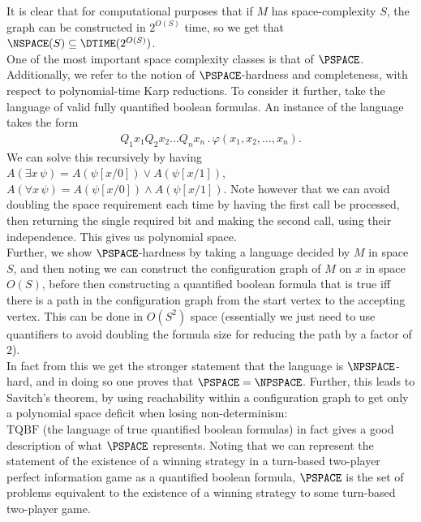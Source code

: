 \documentclass{tikzposter} %
\begin{document}
\begin{columns}
{  It is clear that for computational purposes that if $M$ has space-complexity $S$, the graph can be constructed in $2^{O(S)}$ time, so we get that $\NSPACE(S) \subseteq \DTIME(2^{O(S)})$. \\

  One of the most important space complexity classes is that of $\PSPACE$. Additionally, we refer to the notion of $\PSPACE$-hardness and completeness, with respect to polynomial-time Karp reductions. To consider it further, take the language of valid fully quantified boolean formulas. An instance of the language takes the form
  \begin{align*}
    Q_{1} x_{1} Q_{2} x_{2} \dots Q_{n} x_{n} \,.\, \varphi(x_{1},x_{2},\dots,x_{n}).
  \end{align*}
  We can solve this recursively by having $A(\exists x\, \psi) = A(\psi[x / 0]) \lor A(\psi[x/1])$, $A(\forall x\, \psi) = A(\psi[x/0]) \land A(\psi[x/1])$. Note however that we can avoid doubling the space requirement each time by having the first call be processed, then returning the single required bit and making the second call, using their independence. This gives us polynomial space. \\

  Further, we show $\PSPACE$-hardness by taking a language decided by $M$ in space $S$, and then noting we can construct the configuration graph of $M$ on $x$ in space $O(S)$, before then constructing a quantified boolean formula that is true iff there is a path in the configuration graph from the start vertex to the accepting vertex. This can be done in $O(S^{2})$ space (essentially we just need to use quantifiers to avoid doubling the formula size for reducing the path by a factor of $2$). \\

  In fact from this we get the stronger statement that the language is $\NPSPACE$-hard, and in doing so one proves that $\PSPACE = \NPSPACE$. Further, this leads to Savitch's theorem, by using reachability within a configuration graph to get only a polynomial space deficit when losing non-determinism: \\

  $\mathrm{TQBF}$ (the language of true quantified boolean formulas) in fact gives a good description of what $\PSPACE$ represents. Noting that we can represent the statement of the existence of a winning strategy in a turn-based two-player perfect information game as a quantified boolean formula, $\PSPACE$ is the set of problems equivalent to the existence of a winning strategy to some turn-based two-player game. \\

}
\end{columns}
\end{document}
